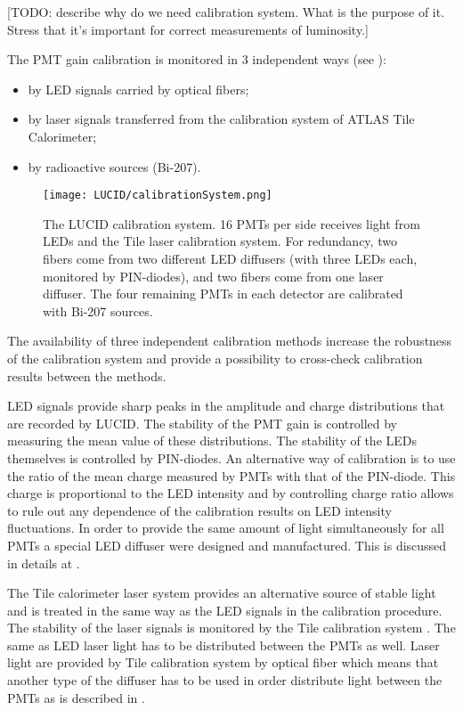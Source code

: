 
[TODO: describe why do we need calibration system. What is the purpose of it. Stress that it's important for correct measurements of luminosity.]

The PMT gain calibration is monitored in 3 independent ways (see ):
\begin{itemize}
 \item by LED signals carried by optical fibers;
 \item by laser signals transferred from the calibration system of ATLAS Tile Calorimeter;
 \item by radioactive sources (Bi-207).
\end{itemize}

\begin{figure}
\centering
\texttt{[image: LUCID/calibrationSystem.png]}
\caption{The LUCID calibration system. 16 PMTs per side receives light from LEDs and the Tile laser calibration 
system. 
For redundancy, two fibers come from two different LED diffusers (with three LEDs each, monitored by 
PIN-diodes), and two fibers come from one laser diffuser. The four remaining PMTs in each detector are calibrated 
with Bi-207 sources.}
\label{fig:calibrationSystem}
\end{figure}

The availability of three independent calibration methods increase the robustness of the calibration system 
and provide a possibility to cross-check calibration results between the methods.

LED signals provide sharp peaks in the amplitude and charge distributions that are recorded by LUCID.
The stability of the PMT gain is controlled by measuring the mean value of these distributions. 
The stability of the LEDs themselves is controlled by PIN-diodes.
An alternative way of calibration is to use the ratio of the mean charge measured by PMTs with that of the 
PIN-diode. 
This charge is proportional to the LED intensity and by controlling charge ratio allows to rule out any 
dependence of the calibration results on LED intensity fluctuations.
In order to provide the same amount of light simultaneously for all PMTs a special LED diffuser were designed and manufactured.
This is discussed in details at .

The Tile calorimeter laser system provides an alternative source of stable light and is treated in the same way
as the LED signals in the calibration procedure. 
The stability of the laser signals is monitored by the Tile calibration system \cite{atlasGeneral}.
The same as LED laser light has to be distributed between the PMTs as well.
Laser light are provided by Tile calibration system by optical fiber which means that another type of the diffuser
has to be used in order distribute light between the PMTs as is described in .

